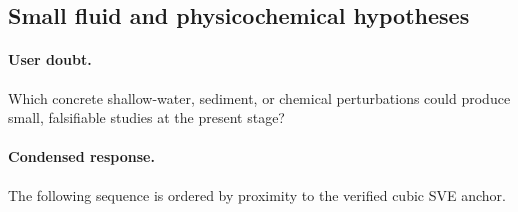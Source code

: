 \documentclass[11pt]{article}
\begin{document}
\subsection{Small fluid and physicochemical hypotheses}

\paragraph{User doubt.}
Which concrete shallow-water, sediment, or chemical perturbations could produce
small, falsifiable studies at the present stage?

\paragraph{Condensed response.}
The following sequence is ordered by proximity to the verified cubic SVE anchor.
\end{document}
